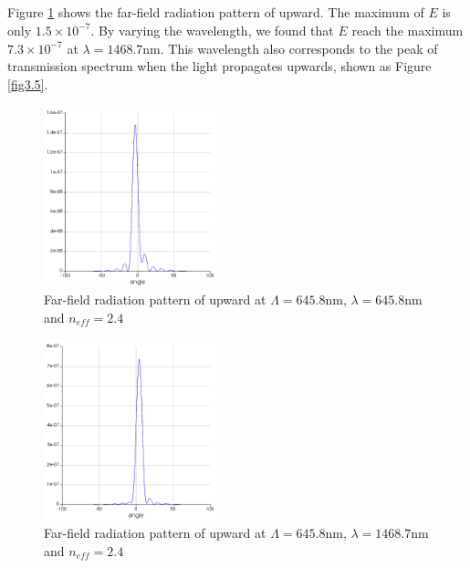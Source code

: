 \documentclass[fontsize=11pt]{scrartcl}
\begin{document}
\subsection{}
Figure \ref{fig3.3} shows the far-field radiation pattern of upward. 
The maximum of $E$ is only $1.5\times 10^{-7}$. 
By varying the wavelength, we found that $E$ reach the maximum $7.3\times 10^{-7}$ 
at $\lambda=1468.7\mathrm{nm}$. This wavelength also corresponds to 
the peak of transmission spectrum when the light propagates upwards, 
shown as Figure \ref{fig3.5}.
\begin{figure}[H]
    \centering
     \includegraphics[width=0.45\textwidth]{img/fig3.3.png}
     \caption{Far-field radiation pattern of upward at $\Lambda=645.8\mathrm{nm}$,
     $\lambda=645.8\mathrm{nm}$ and $n_{eff}=2.4$}
     \label{fig3.3}
\end{figure}
\begin{figure}[H]
    \centering
     \includegraphics[width=0.45\textwidth]{img/fig3.4.png}
     \caption{Far-field radiation pattern of upward at $\Lambda=645.8\mathrm{nm}$,
     $\lambda=1468.7\mathrm{nm}$ and $n_{eff}=2.4$}
     \label{fig3.4}
\end{figure}
\end{document}
